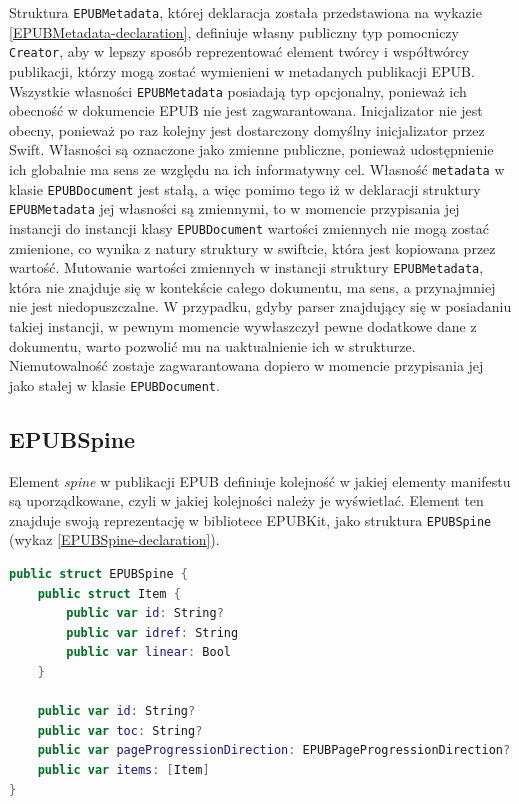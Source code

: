 Struktura \texttt{EPUBMetadata}, której deklaracja została przedstawiona na wykazie \ref{EPUBMetadata-declaration}, definiuje własny publiczny typ pomocniczy \texttt{Creator}, aby w lepszy sposób reprezentować element twórcy i współtwórcy publikacji, którzy mogą zostać wymienieni w metadanych publikacji EPUB. Wszystkie własności \texttt{EPUBMetadata} posiadają typ opcjonalny, ponieważ ich obecność w dokumencie EPUB nie jest zagwarantowana. Inicjalizator nie jest obecny, ponieważ po raz kolejny jest dostarczony domyślny inicjalizator przez Swift. Własności są oznaczone jako zmienne publiczne, ponieważ udostępnienie ich globalnie ma sens ze względu na ich informatywny cel. Własność \texttt{metadata} w klasie \texttt{EPUBDocument} jest stałą, a więc pomimo tego iż w deklaracji struktury \texttt{EPUBMetadata} jej własności są zmiennymi, to w momencie przypisania jej instancji do instancji klasy \texttt{EPUBDocument} wartości zmiennych nie mogą zostać zmienione, co wynika z natury struktury w swiftcie, która jest kopiowana przez wartość. Mutowanie wartości zmiennych w instancji struktury \texttt{EPUBMetadata}, która nie znajduje się w kontekście całego dokumentu, ma sens, a przynajmniej nie jest niedopuszczalne. W przypadku, gdyby parser znajdujący się w posiadaniu takiej instancji, w pewnym momencie wywłaszczył pewne dodatkowe dane z dokumentu, warto pozwolić mu na uaktualnienie ich w strukturze. Niemutowalność zostaje zagwarantowana dopiero w momencie przypisania jej jako stałej w klasie \texttt{EPUBDocument}.

\subsection{EPUBSpine}

Element \textit{spine} w publikacji EPUB definiuje kolejność w jakiej elementy manifestu są uporządkowane, czyli w jakiej kolejności należy je wyświetlać. Element ten znajduje swoją reprezentację w bibliotece EPUBKit, jako struktura \texttt{EPUBSpine} (wykaz \ref{EPUBSpine-declaration}).

\begin{lstlisting}[caption={Struktura EPUBSpine}, language=swift,label=EPUBSpine-declaration]
public struct EPUBSpine {
    public struct Item {
        public var id: String?
        public var idref: String
        public var linear: Bool
    }

    public var id: String?
    public var toc: String?
    public var pageProgressionDirection: EPUBPageProgressionDirection?
    public var items: [Item]
}
\end{lstlisting}

